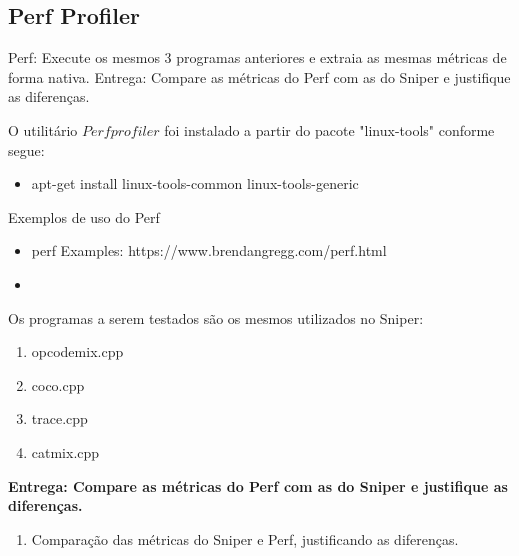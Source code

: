 
\subsection{Perf Profiler}

Perf: Execute os mesmos 3 programas anteriores e extraia as mesmas métricas de forma nativa. Entrega: Compare as métricas do Perf com as do Sniper e justifique as diferenças.

O utilitário $Perf profiler$ foi instalado a partir do pacote "linux-tools" conforme segue:

\begin{itemize}
    \item apt-get install linux-tools-common linux-tools-generic
\end{itemize}

Exemplos de uso do Perf

\begin{itemize}
    \item perf Examples: https://www.brendangregg.com/perf.html
    \item 
\end{itemize}


Os programas a serem testados são os mesmos utilizados no Sniper:

\begin{enumerate}
    \item opcodemix.cpp
    \item coco.cpp 
    \item trace.cpp
    \item catmix.cpp 
\end{enumerate}

\textbf{Entrega: Compare as métricas do Perf com as do Sniper e justifique as diferenças.}

\begin{enumerate}
    \item Comparação das métricas do Sniper e Perf, justificando as diferenças.
\end{enumerate}
